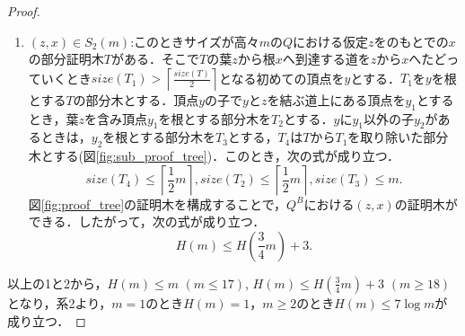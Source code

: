 \begin{proof}
\begin{enumerate}
  \item $(z,x)\in S_2(m)$:このときサイズが高々$m$の$Q$における仮定$z$をのもとでの$x$の部分証明木$T$がある．そこで$T$の葉$z$から根$x$へ到達する道を$z$から$x$へたどっていくとき$size(T_1)>\left\lceil{\frac{size(T)}{2}}\right\rceil$となる初めての頂点を$y$とする．$T_1$を$y$を根とする$T$の部分木とする．頂点$y$の子で$y$と$z$を結ぶ道上にある頂点を$y_1$とするとき，葉$z$を含み頂点$y_1$を根とする部分木を$T_2$とする．$y$に$y_1$以外の子$y_2$があるときは，$y_2$を根とする部分木を$T_3$とする，$T_4$は$T$から$T_1$を取り除いた部分木とする(図\ref{fig:sub_proof_tree})．このとき，次の式が成り立つ．
  $$size(T_4)\leq\left\lceil{\frac{1}{2}m}\right\rceil,size(T_2)\leq\left\lceil{\frac{1}{2}m}\right\rceil, size(T_3)\leq m.$$
  図\ref{fig:proof_tree}の証明木を構成することで，$Q^{B}$における$(z,x)$の証明木ができる．したがって，次の式が成り立つ．
  $$H(m)\leq H(\frac{3}{4}m)+3.$$
\end{enumerate}

  以上の1と2から，$H(m)\leq m$ $(m\leq 17)$, $H(m)\leq H(\frac{3}{4}m)+3$ $(m\geq 18)$となり，系2より，$m=1$のとき$H(m)=1$，$m\geq 2$のとき$H(m)\leq 7\log m$が成り立つ．
\end{proof}

